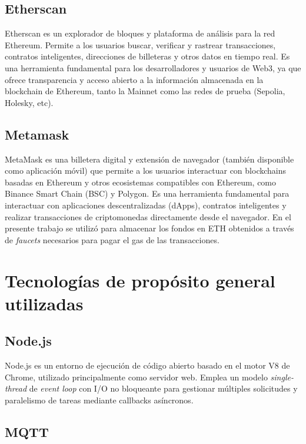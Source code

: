 \subsection{Etherscan}

Etherscan \cite{etherscan} es un explorador de bloques y plataforma de análisis para la red Ethereum. Permite a los usuarios buscar, verificar y rastrear transacciones, contratos inteligentes, direcciones de billeteras y otros datos en tiempo real. Es una herramienta fundamental para los desarrolladores y usuarios de Web3, ya que ofrece transparencia y acceso abierto a la información almacenada en la blockchain de Ethereum, tanto la Mainnet como las redes de prueba (Sepolia, Holesky, etc).

\subsection{Metamask}

MetaMask \cite{metamask} es una billetera digital y extensión de navegador (también disponible como aplicación móvil) que permite a los usuarios interactuar con blockchains basadas en Ethereum y otros ecosistemas compatibles con Ethereum, como Binance Smart Chain (BSC) y Polygon. Es una herramienta fundamental para interactuar con aplicaciones descentralizadas (dApps), contratos inteligentes y realizar transacciones de criptomonedas directamente desde el navegador.
En el presente trabajo se utilizó para almacenar los fondos en ETH obtenidos a través de \textit{faucets} necesarios para pagar el gas de las transacciones.




\section{Tecnologías de propósito general utilizadas}

\subsection{Node.js}

Node.js \citep{nodejs} es un entorno de ejecución de código abierto basado en el motor V8 de Chrome, utilizado principalmente como servidor web. Emplea un modelo \textit{single-thread} de \textit{event loop} con I/O no bloqueante para gestionar múltiples solicitudes y paralelismo de tareas mediante callbacks asíncronos.


\subsection{MQTT}

